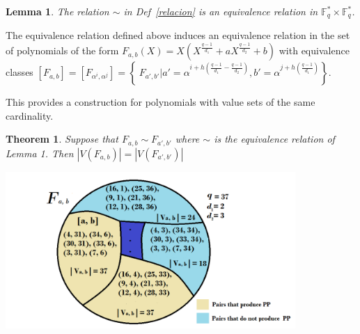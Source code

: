 \documentclass[landscape,final,paperwidth=48in,paperheight=36in]{baposter}
\newtheorem*{example*}{Example}
\newtheorem*{definition*}{Definition}
\newtheorem{lemma}{Lemma}
\newtheorem{theorem}{Theorem}
\begin{document}
\begin{poster}
{\begin{lemma}
  The relation $\sim$ in Def~\ref{relacion} is an equivalence relation in $\mathbb{F}_q^* \times \mathbb{F}_q^*$.

\end{lemma}


  The equivalence relation defined above induces an equivalence relation in the set of polynomials of the form $F_{a,b}(X) = X(X^{\frac{q-1}{d_1}} + aX^{\frac{q-1}{d_2}} +b)$ with equivalence classes $[F_{a,b}] = [F_{\alpha^i, \alpha^j}] = \left\{\ F_{a',b'} | a' = \alpha^{i+h(\frac{q-1}{d_1} - \frac{q-1}{d_2})}, b' = \alpha^{j+h(\frac{q-1}{d_1})} \right\}$.

  This provides a construction for polynomials with value sets of the same cardinality. 
\begin{theorem}
  
  Suppose that $F_{a,b} \sim F_{a',b'}$ where $\sim$ is the equivalence relation of Lemma 1. Then $|V(F_{a,b})| = |V(F_{a',b'})|$

\end{theorem}

\includegraphics[width=11cm]{clases}
}\label{Results}

\end{poster}
\end{document}

